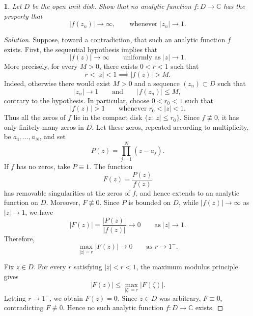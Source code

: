 \documentclass[12pt, a4paper]{report}
\theoremstyle{spaced}
\newtheorem{exercise}{}
\begin{document}
\begin{exercise}
	Let \(D\) be the open unit disk. Show that no analytic function
	\(f:D\to\mathbb{C}\) has the property that
	\[
		|f(z_n)|\to\infty,
		\qquad \text{whenever } |z_n|\to 1.
	\]
\end{exercise}
\begin{proof}[Solution]
	Suppose, toward a contradiction, that such an analytic function \(f\) exists.
	First, the sequential hypothesis implies that
	\[
		|f(z)|\longrightarrow \infty \qquad \text{uniformly as } |z|\to 1.
	\]
	More precisely, for every \(M>0\), there exists \(0<r<1\) such that
	\[
		r<|z|<1 \implies |f(z)|>M.
	\]
	Indeed, otherwise there would exist \(M>0\) and a sequence
	\((z_n)\subset D\) such that
	\[
		|z_n|\to 1
		\qquad\text{and}\qquad
		|f(z_n)|\leq M,
	\]
	contrary to the hypothesis.
	In particular, choose \(0<r_0<1\) such that
	\[
		|f(z)|>1 \qquad\text{whenever } r_0<|z|<1.
	\]
	Thus all the zeros of \(f\) lie in the compact disk
	\(\{z:|z|\leq r_0\}\). Since \(f\not\equiv 0\), it has only finitely many
	zeros in \(D\). Let these zeros, repeated according to multiplicity, be
	\(a_1,\dots,a_N\), and set
	\[
		P(z)=\prod_{j=1}^{N}(z-a_j).
	\]
	If \(f\) has no zeros, take \(P\equiv 1\).
	The function
	\[
		F(z)=\frac{P(z)}{f(z)}
	\]
	has removable singularities at the zeros of \(f\), and hence extends to
	an analytic function on \(D\). Moreover, \(F\not\equiv 0\).
	Since \(P\) is bounded on \(D\), while \(|f(z)|\to\infty\) as
	\(|z|\to1\), we have
	\[
		|F(z)|=\frac{|P(z)|}{|f(z)|}\longrightarrow 0
		\qquad\text{as } |z|\to1.
	\]
	Therefore,
	\[
		\max_{|z|=r}|F(z)|\longrightarrow 0
		\qquad\text{as } r\to1^-.
	\]

	Fix \(z\in D\). For every \(r\) satisfying \(|z|<r<1\), the maximum
	modulus principle gives
	\[
		|F(z)|\leq \max_{|\zeta|=r}|F(\zeta)|.
	\]
	Letting \(r\to1^-\), we obtain \(F(z)=0\). Since \(z\in D\) was
	arbitrary, \(F\equiv0\), contradicting \(F\not\equiv0\).
	Hence no such analytic function \(f:D\to\mathbb C\) exists.
\end{proof}
\end{document}
